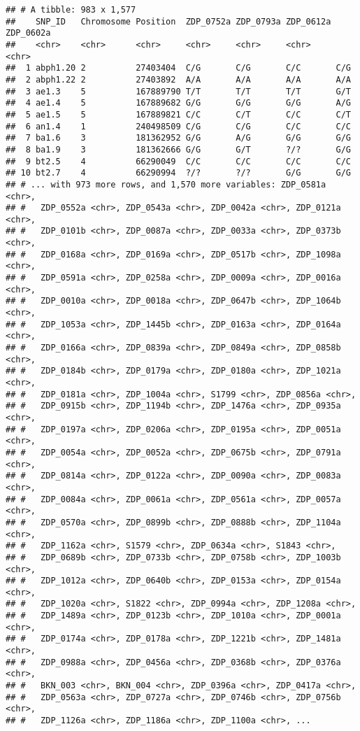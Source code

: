 \documentclass[]{article}
\begin{document}
\begin{verbatim}
## # A tibble: 983 x 1,577
##    SNP_ID   Chromosome Position  ZDP_0752a ZDP_0793a ZDP_0612a ZDP_0602a
##    <chr>    <chr>      <chr>     <chr>     <chr>     <chr>     <chr>    
##  1 abph1.20 2          27403404  C/G       C/G       C/C       C/G      
##  2 abph1.22 2          27403892  A/A       A/A       A/A       A/A      
##  3 ae1.3    5          167889790 T/T       T/T       T/T       G/T      
##  4 ae1.4    5          167889682 G/G       G/G       G/G       A/G      
##  5 ae1.5    5          167889821 C/C       C/T       C/C       C/T      
##  6 an1.4    1          240498509 C/G       C/G       C/C       C/C      
##  7 ba1.6    3          181362952 G/G       A/G       G/G       G/G      
##  8 ba1.9    3          181362666 G/G       G/T       ?/?       G/G      
##  9 bt2.5    4          66290049  C/C       C/C       C/C       C/C      
## 10 bt2.7    4          66290994  ?/?       ?/?       G/G       G/G      
## # ... with 973 more rows, and 1,570 more variables: ZDP_0581a <chr>,
## #   ZDP_0552a <chr>, ZDP_0543a <chr>, ZDP_0042a <chr>, ZDP_0121a <chr>,
## #   ZDP_0101b <chr>, ZDP_0087a <chr>, ZDP_0033a <chr>, ZDP_0373b <chr>,
## #   ZDP_0168a <chr>, ZDP_0169a <chr>, ZDP_0517b <chr>, ZDP_1098a <chr>,
## #   ZDP_0591a <chr>, ZDP_0258a <chr>, ZDP_0009a <chr>, ZDP_0016a <chr>,
## #   ZDP_0010a <chr>, ZDP_0018a <chr>, ZDP_0647b <chr>, ZDP_1064b <chr>,
## #   ZDP_1053a <chr>, ZDP_1445b <chr>, ZDP_0163a <chr>, ZDP_0164a <chr>,
## #   ZDP_0166a <chr>, ZDP_0839a <chr>, ZDP_0849a <chr>, ZDP_0858b <chr>,
## #   ZDP_0184b <chr>, ZDP_0179a <chr>, ZDP_0180a <chr>, ZDP_1021a <chr>,
## #   ZDP_0181a <chr>, ZDP_1004a <chr>, S1799 <chr>, ZDP_0856a <chr>,
## #   ZDP_0915b <chr>, ZDP_1194b <chr>, ZDP_1476a <chr>, ZDP_0935a <chr>,
## #   ZDP_0197a <chr>, ZDP_0206a <chr>, ZDP_0195a <chr>, ZDP_0051a <chr>,
## #   ZDP_0054a <chr>, ZDP_0052a <chr>, ZDP_0675b <chr>, ZDP_0791a <chr>,
## #   ZDP_0814a <chr>, ZDP_0122a <chr>, ZDP_0090a <chr>, ZDP_0083a <chr>,
## #   ZDP_0084a <chr>, ZDP_0061a <chr>, ZDP_0561a <chr>, ZDP_0057a <chr>,
## #   ZDP_0570a <chr>, ZDP_0899b <chr>, ZDP_0888b <chr>, ZDP_1104a <chr>,
## #   ZDP_1162a <chr>, S1579 <chr>, ZDP_0634a <chr>, S1843 <chr>,
## #   ZDP_0689b <chr>, ZDP_0733b <chr>, ZDP_0758b <chr>, ZDP_1003b <chr>,
## #   ZDP_1012a <chr>, ZDP_0640b <chr>, ZDP_0153a <chr>, ZDP_0154a <chr>,
## #   ZDP_1020a <chr>, S1822 <chr>, ZDP_0994a <chr>, ZDP_1208a <chr>,
## #   ZDP_1489a <chr>, ZDP_0123b <chr>, ZDP_1010a <chr>, ZDP_0001a <chr>,
## #   ZDP_0174a <chr>, ZDP_0178a <chr>, ZDP_1221b <chr>, ZDP_1481a <chr>,
## #   ZDP_0988a <chr>, ZDP_0456a <chr>, ZDP_0368b <chr>, ZDP_0376a <chr>,
## #   BKN_003 <chr>, BKN_004 <chr>, ZDP_0396a <chr>, ZDP_0417a <chr>,
## #   ZDP_0563a <chr>, ZDP_0727a <chr>, ZDP_0746b <chr>, ZDP_0756b <chr>,
## #   ZDP_1126a <chr>, ZDP_1186a <chr>, ZDP_1100a <chr>, ...
\end{verbatim}
\end{document}
